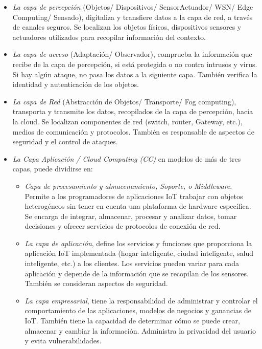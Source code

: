     \begin{itemize}
        \item \textit{La capa de percepción} (Objetos/ Dispositivos/ SensorActuador/ WSN/ Edge Computing/ Sensado), digitaliza y transfiere datos a la capa de red, a través de canales seguros. Se localizan los objetos físicos, dispositivos sensores y actuadores utilizados para recopilar información del contexto.
        \item \textit{La capa de acceso} (Adaptación/ Observador), comprueba la información que recibe de la capa de percepción, si está protegida o no contra intrusos y virus. Si hay algún ataque, no pasa los datos a la siguiente capa. También verifica la identidad y autenticación de los objetos.
        \item \textit{La capa de Red} (Abstracción de Objetos/ Transporte/ Fog computing), transporta y transmite los datos, recopilados de la capa de percepción, hacia la cloud. Se localizan componentes de red (switch, router, Gateway, etc.), medios de comunicación y protocolos. También es responsable de aspectos de seguridad y el control de ataques.
        \item \textit{La Capa Aplicación / Cloud Computing (CC)} en modelos de más de tres capas, puede dividirse en:
            \begin{itemize}
                \item \textit{Capa de procesamiento y almacenamiento, Soporte, o Middleware}. Permite a los programadores de aplicaciones IoT trabajar con objetos heterogéneos sin tener en cuenta una plataforma de hardware específica. Se encarga de integrar, almacenar, procesar y analizar datos, tomar decisiones y ofrecer servicios de protocolos de conexión de red.
                \item \textit{La capa de aplicación}, define los servicios y funciones que proporciona la aplicación IoT implementada (hogar inteligente, ciudad inteligente, salud inteligente, etc.) a los clientes. Los servicios pueden variar para cada aplicación y depende de la información que se recopilan de los sensores. También se consideran aspectos de seguridad.
                \item \textit{La capa empresarial}, tiene la responsabilidad de administrar y controlar el comportamiento de las aplicaciones, modelos de negocios y ganancias de IoT. También tiene la capacidad de determinar cómo se puede crear, almacenar y cambiar la información. Administra la privacidad del usuario y evita vulnerabilidades.\\\\\\\\
            \end{itemize} 
    \end{itemize}

